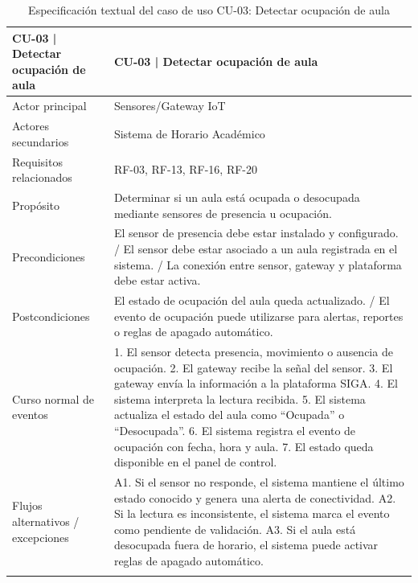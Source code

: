\begingroup
\small
\begin{longtable}{|P{0.5000}|P{0.5000}|}
\hline
CU-03 | Detectar ocupación de aula & CU-03 | Detectar ocupación de aula \\ \hline
Actor principal & Sensores/Gateway IoT \\ \hline
Actores secundarios & Sistema de Horario Académico \\ \hline
Requisitos relacionados & RF-03, RF-13, RF-16, RF-20 \\ \hline
Propósito & Determinar si un aula está ocupada o desocupada mediante sensores de presencia u ocupación. \\ \hline
Precondiciones & El sensor de presencia debe estar instalado y configurado. / El sensor debe estar asociado a un aula registrada en el sistema. / La conexión entre sensor, gateway y plataforma debe estar activa. \\ \hline
Postcondiciones & El estado de ocupación del aula queda actualizado. / El evento de ocupación puede utilizarse para alertas, reportes o reglas de apagado automático. \\ \hline
Curso normal de eventos & 1. El sensor detecta presencia, movimiento o ausencia de ocupación. 2. El gateway recibe la señal del sensor. 3. El gateway envía la información a la plataforma SIGA. 4. El sistema interpreta la lectura recibida. 5. El sistema actualiza el estado del aula como ``Ocupada'' o ``Desocupada''. 6. El sistema registra el evento de ocupación con fecha, hora y aula. 7. El estado queda disponible en el panel de control. \\ \hline
Flujos alternativos / excepciones & A1. Si el sensor no responde, el sistema mantiene el último estado conocido y genera una alerta de conectividad. A2. Si la lectura es inconsistente, el sistema marca el evento como pendiente de validación. A3. Si el aula está desocupada fuera de horario, el sistema puede activar reglas de apagado automático. \\ \hline
\caption{Especificación textual del caso de uso CU-03: Detectar ocupación de aula}
\end{longtable}
\endgroup

